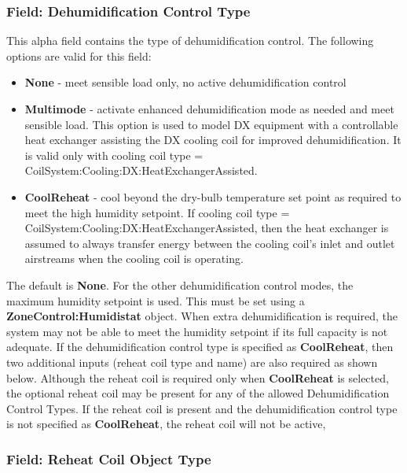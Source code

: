 \subsubsection{Field: Dehumidification Control Type}\label{field-dehumidification-control-type-2-000}

This alpha field contains the type of dehumidification control. The following options are valid for this field:

\begin{itemize}
\item
  \textbf{None} - meet sensible load only, no active dehumidification control
\item
  \textbf{Multimode} - activate enhanced dehumidification mode as needed and meet sensible load. This option is used to model DX equipment with a controllable heat exchanger assisting the DX cooling coil for improved dehumidification. It is valid only with cooling coil type = CoilSystem:Cooling:DX:HeatExchangerAssisted.
\item
  \textbf{CoolReheat} - cool beyond the dry-bulb temperature set point as required to meet the high humidity setpoint. If cooling coil type = CoilSystem:Cooling:DX:HeatExchangerAssisted, then the heat exchanger is assumed to always transfer energy between the cooling coil's inlet and outlet airstreams when the cooling coil is operating.
\end{itemize}

The default is \textbf{None}. For the other dehumidification control modes, the maximum humidity setpoint is used. This must be set using a \textbf{ZoneControl:Humidistat} object. When extra dehumidification is required, the system may not be able to meet the humidity setpoint if its full capacity is not adequate. If the dehumidification control type is specified as \textbf{CoolReheat}, then two additional inputs (reheat coil type and name) are also required as shown below. Although the reheat coil is required only when \textbf{CoolReheat} is selected, the optional reheat coil may be present for any of the allowed Dehumidification Control Types. If the reheat coil is present and the dehumidification control type is not specified as \textbf{CoolReheat}, the reheat coil will not be active,

\subsubsection{Field: Reheat Coil Object Type}\label{field-reheat-coil-object-type-1-000}

